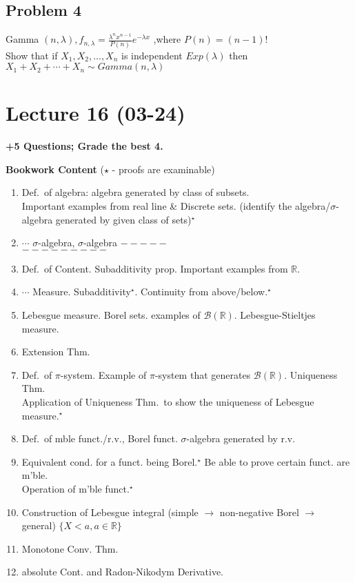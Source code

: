 \subsection*{Problem 4}
Gamma $ (n,\lambda) ,f_{n,\lambda}=\frac{\lambda^nx^{n-1}}{P(n)}e^{-\lambda x}$ ,where $ P(n)=(n-1)! $
\\Show that if $ X_1,X_2,...,X_n $ is independent $ Exp(\lambda) $ then $ X_1+X_2+\cdots+X_n\sim Gamma(n,\lambda) $ 
\section{Lecture 16 (03-24)}
\noindent\textbf{+5 Questions; Grade the best 4.}

\noindent\textbf{Bookwork Content} \quad (\textsf{$\star$ - proofs are examinable})

\begin{enumerate}
\item Def.\ of algebra: algebra generated by class of subsets. \\
Important examples from real line \& Discrete sets. (identify the algebra/$\sigma$-algebra generated by given class of sets)$^\star$

\item $\cdots$ $\sigma$-algebra, $\sigma$-algebra $- - - - -$ \\
$- - - - - - - - -$

\item Def.\ of Content. Subadditivity prop. Important examples from $\mathbb{R}$.

\item $\cdots$ Measure. Subadditivity$^\star$. Continuity from above/below.$^\star$

\item Lebesgue measure. Borel sets. examples of $\mathcal{B}(\mathbb{R})$. Lebesgue-Stieltjes measure.

\item Extension Thm.

\item Def.\ of $\pi$-system. Example of $\pi$-system that generates $\mathcal{B}(\mathbb{R})$. Uniqueness Thm. \\
Application of Uniqueness Thm.\ to show the uniqueness of Lebesgue measure.$^\star$

\item Def.\ of mble funct./r.v., Borel funct. $\sigma$-algebra generated by r.v.

\item Equivalent cond. for a funct. being Borel.$^\star$ Be able to prove certain funct. are m'ble. \\
Operation of m'ble funct.$^\star$

\item Construction of Lebesgue integral (simple $\rightarrow$ non-negative Borel $\rightarrow$ general) $\{X<a, a\in\mathbb{R}\}$

\item Monotone Conv. Thm.

\item absolute Cont. and Radon-Nikodym Derivative.
\end{enumerate}

